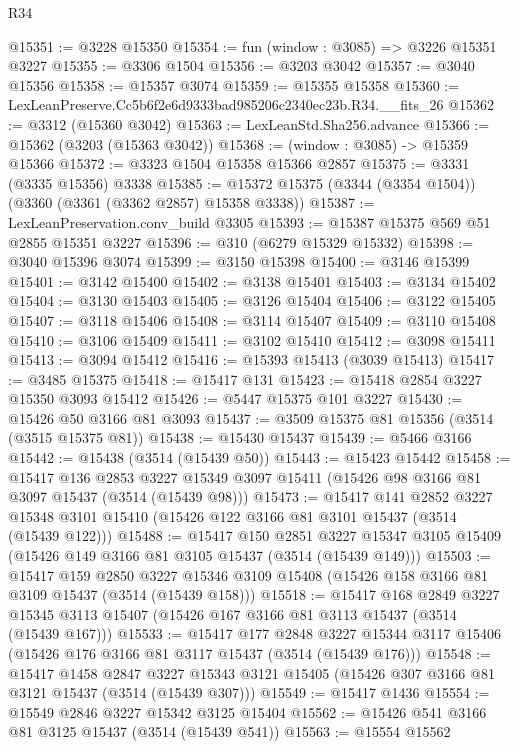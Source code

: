 \begin{lexlean}{R34}
\begin{coremodule}
@15351 := @3228 @15350
@15354 := fun (window : @3085) => @3226 @15351 @3227
@15355 := @3306 @1504
@15356 := @3203 @3042
@15357 := @3040 @15356
@15358 := @15357 @3074
@15359 := @15355 @15358
@15360 := LexLeanPreserve.Cc5b6f2e6d9333bad985206c2340ec23b.R34.__fits_26
@15362 := @3312 (@15360 @3042)
@15363 := LexLeanStd.Sha256.advance
@15366 := @15362 (@3203 (@15363 @3042))
@15368 := (window : @3085) -> @15359 @15366
@15372 := @3323 @1504 @15358 @15366 @2857
@15375 := @3331 (@3335 @15356) @3338
@15385 := @15372 @15375 (@3344 (@3354 @1504)) (@3360 (@3361 (@3362 @2857) @15358 @3338))
@15387 := LexLeanPreservation.conv_build @3305
@15393 := @15387 @15375 @569 @51 @2855 @15351 @3227
@15396 := @310 (@6279 @15329 @15332)
@15398 := @3040 @15396 @3074
@15399 := @3150 @15398
@15400 := @3146 @15399
@15401 := @3142 @15400
@15402 := @3138 @15401
@15403 := @3134 @15402
@15404 := @3130 @15403
@15405 := @3126 @15404
@15406 := @3122 @15405
@15407 := @3118 @15406
@15408 := @3114 @15407
@15409 := @3110 @15408
@15410 := @3106 @15409
@15411 := @3102 @15410
@15412 := @3098 @15411
@15413 := @3094 @15412
@15416 := @15393 @15413 (@3039 @15413)
@15417 := @3485 @15375
@15418 := @15417 @131
@15423 := @15418 @2854 @3227 @15350 @3093 @15412
@15426 := @5447 @15375 @101 @3227
@15430 := @15426 @50 @3166 @81 @3093
@15437 := @3509 @15375 @81 @15356 (@3514 (@3515 @15375 @81))
@15438 := @15430 @15437
@15439 := @5466 @3166
@15442 := @15438 (@3514 (@15439 @50))
@15443 := @15423 @15442
@15458 := @15417
    @136
    @2853
    @3227
    @15349
    @3097
    @15411
    (@15426 @98 @3166 @81 @3097 @15437 (@3514 (@15439 @98)))
@15473 := @15417
    @141
    @2852
    @3227
    @15348
    @3101
    @15410
    (@15426 @122 @3166 @81 @3101 @15437 (@3514 (@15439 @122)))
@15488 := @15417
    @150
    @2851
    @3227
    @15347
    @3105
    @15409
    (@15426 @149 @3166 @81 @3105 @15437 (@3514 (@15439 @149)))
@15503 := @15417
    @159
    @2850
    @3227
    @15346
    @3109
    @15408
    (@15426 @158 @3166 @81 @3109 @15437 (@3514 (@15439 @158)))
@15518 := @15417
    @168
    @2849
    @3227
    @15345
    @3113
    @15407
    (@15426 @167 @3166 @81 @3113 @15437 (@3514 (@15439 @167)))
@15533 := @15417
    @177
    @2848
    @3227
    @15344
    @3117
    @15406
    (@15426 @176 @3166 @81 @3117 @15437 (@3514 (@15439 @176)))
@15548 := @15417
    @1458
    @2847
    @3227
    @15343
    @3121
    @15405
    (@15426 @307 @3166 @81 @3121 @15437 (@3514 (@15439 @307)))
@15549 := @15417 @1436
@15554 := @15549 @2846 @3227 @15342 @3125 @15404
@15562 := @15426 @541 @3166 @81 @3125 @15437 (@3514 (@15439 @541))
@15563 := @15554 @15562

\end{coremodule}
\end{lexlean}
